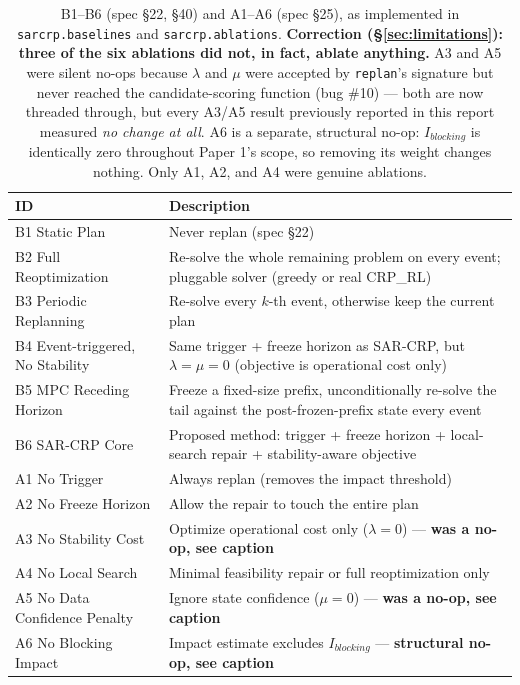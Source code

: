 \documentclass[11pt]{article}
\begin{document}
\begin{table}[h]
\centering
\small
\begin{tabular}{lp{9.5cm}}
\hline
ID & Description \\
\hline
B1 Static Plan & Never replan (spec \S22) \\
B2 Full Reoptimization & Re-solve the whole remaining problem on every event; pluggable solver (greedy or real CRP\_RL) \\
B3 Periodic Replanning & Re-solve every $k$-th event, otherwise keep the current plan \\
B4 Event-triggered, No Stability & Same trigger + freeze horizon as SAR-CRP, but $\lambda=\mu=0$ (objective is operational cost only) \\
B5 MPC Receding Horizon & Freeze a fixed-size prefix, unconditionally re-solve the tail against the post-frozen-prefix state every event \\
B6 SAR-CRP Core & Proposed method: trigger + freeze horizon + local-search repair + stability-aware objective \\
\hline
A1 No Trigger & Always replan (removes the impact threshold) \\
A2 No Freeze Horizon & Allow the repair to touch the entire plan \\
A3 No Stability Cost & Optimize operational cost only ($\lambda=0$) --- \textbf{was a no-op, see caption} \\
A4 No Local Search & Minimal feasibility repair or full reoptimization only \\
A5 No Data Confidence Penalty & Ignore state confidence ($\mu=0$) --- \textbf{was a no-op, see caption} \\
A6 No Blocking Impact & Impact estimate excludes $I_{blocking}$ --- \textbf{structural no-op, see caption} \\
\hline
\end{tabular}
\caption{B1--B6 (spec \S22, \S40) and A1--A6 (spec \S25), as implemented in
\texttt{sarcrp.baselines} and \texttt{sarcrp.ablations}.
\textbf{Correction (\S\ref{sec:limitations}): three of the six ablations did
not, in fact, ablate anything.} A3 and A5 were silent no-ops because
$\lambda$ and $\mu$ were accepted by \texttt{replan}'s signature but never
reached the candidate-scoring function (bug \#10) --- both are now threaded
through, but every A3/A5 result previously reported in this report measured
\emph{no change at all}. A6 is a separate, structural no-op:
$I_{blocking}$ is identically zero throughout Paper 1's scope, so removing
its weight changes nothing. Only A1, A2, and A4 were genuine ablations.}
\label{tab:baselines}
\end{table}
\end{document}
